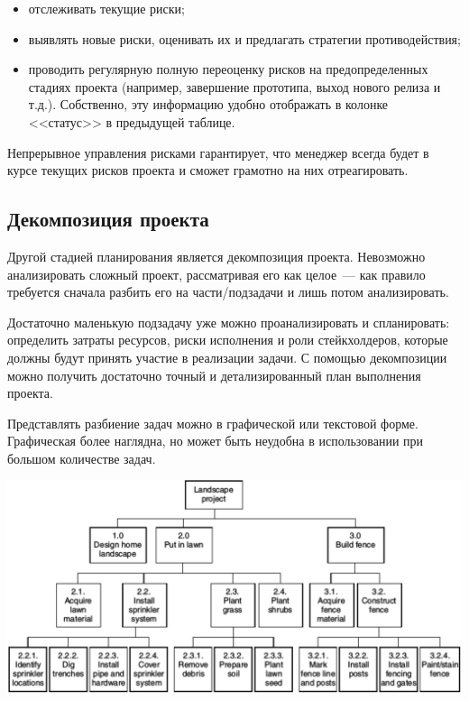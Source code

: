 \documentclass{../../text-style}
\begin{document}
\begin{itemize}
    \item отслеживать текущие риски;
    \item выявлять новые риски, оценивать их и предлагать стратегии противодействия;
    \item проводить регулярную полную переоценку рисков на предопределенных стадиях проекта (например, завершение прототипа, выход нового релиза и т.д.). Собственно, эту информацию удобно отображать в колонке <<статус>> в предыдущей таблице.
\end{itemize}

Непрерывное управления рисками гарантирует, что менеджер всегда будет в курсе текущих рисков проекта и сможет грамотно на них отреагировать.

\subsection{Декомпозиция проекта}

Другой стадией планирования является декомпозиция проекта. Невозможно анализировать сложный проект, рассматривая его как целое~--- как правило требуется сначала разбить его на части/подзадачи и лишь потом анализировать.

Достаточно маленькую подзадачу уже можно проанализировать и спланировать: определить затраты ресурсов, риски исполнения и роли стейкхолдеров, которые должны будут принять участие в реализации задачи. С помощью декомпозиции можно получить достаточно точный и детализированный план выполнения проекта.

Представлять разбиение задач можно в графической или текстовой форме. Графическая более наглядна, но может быть неудобна в использовании при большом количестве задач. 

\begin{center}
    \includegraphics[width=\textwidth]{wbsExample.png}
\end{center}
\end{document}
